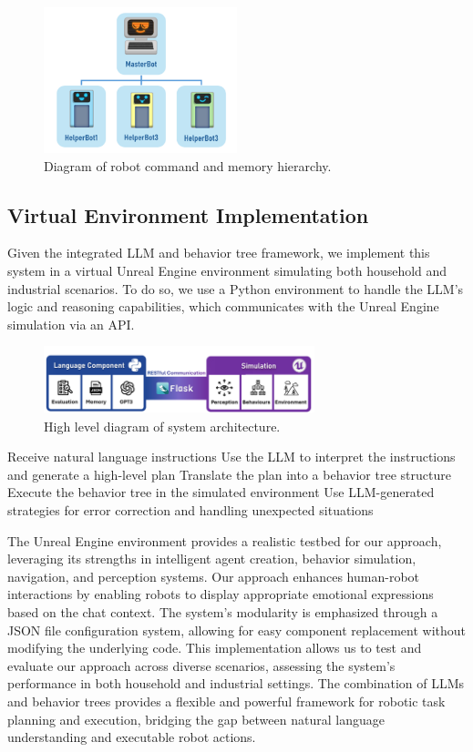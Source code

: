 \documentclass[pdflatex,sn-mathphys-num]{sn-jnl}%
\theoremstyle{thmstyleone}%
\theoremstyle{thmstyletwo}%
\theoremstyle{thmstylethree}%
\begin{document}
\begin{figure}[H]
\centering
\includegraphics[width=0.5\textwidth]{figures/Picture6.png}
\caption{Diagram of robot command and memory hierarchy.}\label{fig9}
\end{figure}


\subsection{Virtual Environment Implementation}
Given the integrated LLM and behavior tree framework, we implement this system in a virtual Unreal Engine environment simulating both household and industrial scenarios. To do so, we use a Python environment to handle the LLM's logic and reasoning capabilities, which communicates with the Unreal Engine simulation via an API.
\begin{figure}[H]
\centering
\includegraphics[width=0.7\textwidth]{figures/Picture2.png}
\caption{High level diagram of system architecture.}\label{fig3}
\end{figure}
Receive natural language instructions
Use the LLM to interpret the instructions and generate a high-level plan
Translate the plan into a behavior tree structure
Execute the behavior tree in the simulated environment
Use LLM-generated strategies for error correction and handling unexpected situations

The Unreal Engine environment provides a realistic testbed for our approach, leveraging its strengths in intelligent agent creation, behavior simulation, navigation, and perception systems.
Our approach enhances human-robot interactions by enabling robots to display appropriate emotional expressions based on the chat context. The system's modularity is emphasized through a JSON file configuration system, allowing for easy component replacement without modifying the underlying code.
This implementation allows us to test and evaluate our approach across diverse scenarios, assessing the system's performance in both household and industrial settings. The combination of LLMs and behavior trees provides a flexible and powerful framework for robotic task planning and execution, bridging the gap between natural language understanding and executable robot actions.
\end{document}
